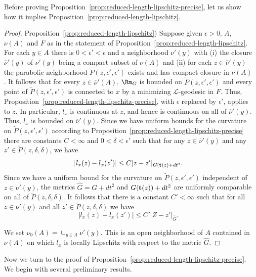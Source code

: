 Before proving Proposition~\ref{prop:reduced-length-lipschitz-precise}, let us show how it implies
Proposition~\ref{prop:reduced-length-lipschitz}.

\begin{proof}
\sketch
Proposition~\ref{prop:reduced-length-lipschitz})
Suppose given $\epsilon>0$, $A$, $\nu(A)$ and $F$ as in
the statement of Proposition~\ref{prop:reduced-length-lipschitz}. For each $y\in A$ there is
$0<\epsilon'<\epsilon$ and a neighborhood $\nu'(y)$ with (i) the closure
$\overline{\nu}'(y)$ of $\nu'(y)$ being a compact subset of $\nu(A)$ and (ii)
for each $z\in \overline{\nu}'(y)$ the parabolic neighborhood $\widetilde
P(z,\epsilon',\epsilon')$ exists and has compact closure in $\nu(A)$. It
follows that for every $z\in \overline{\nu}'(A)$, $\Rm_G$ is bounded on
$\widetilde P(z,\epsilon',\epsilon')$ and every point of $\widetilde
P(z,\epsilon',\epsilon')$ is connected to $x$ by a minimizing ${\mathcal
L}$-geodesic in $F$. Thus, Proposition~\ref{prop:reduced-length-lipschitz-precise}, with $\epsilon$ replaced
by $\epsilon'$, applies to $z$. In particular, $l_x$ is continuous at $z$, and
hence is continuous on all of $\overline{\nu}'(y)$. Thus, $l_x$ is bounded on
$\overline{\nu}'(y)$. Since we have uniform bounds for the curvature on
$\widetilde P(z,\epsilon',\epsilon')$ according to Proposition~\ref{prop:reduced-length-lipschitz-precise}
there are constants $C<\infty$ and $0<\delta<\epsilon'$ such that for any $z\in
\overline{\nu}'(y)$ and any $z'\in \widetilde P(z,\delta,\delta)$, we have
$$|l_x(z)-l_x(z')|\le C|z-z'|_{G({\bf t}(z)+dt^2}.$$
Since we have a uniform bound for the curvature on $\widetilde
P(z,\epsilon',\epsilon')$ independent of $z\in \nu'(y)$, the metrics $\widehat
G=G+dt^2$ and $G({\bf t}(z))+dt^2$ are uniformly comparable on all of
$\widetilde P(z,\delta,\delta)$. It follows that there is a constant
$C'<\infty$ such that for all $z\in \nu'(y)$ and all $z'\in \widetilde
P(z,\delta,\delta)$ we have
$$|l_x(z)-l_x(z')|\le C'|Z-z'|_{\widehat G}.$$

We set $\nu_0(A)=\cup_{y\in A}\nu'(y)$. This is an open neighborhood of $A$
contained in $\nu(A)$ on which $l_x$ is locally Lipschitz with respect to the
metric $\widehat G$.
\end{proof}



Now we turn to the proof of Proposition~\ref{prop:reduced-length-lipschitz-precise}. We begin with
several preliminary results.



